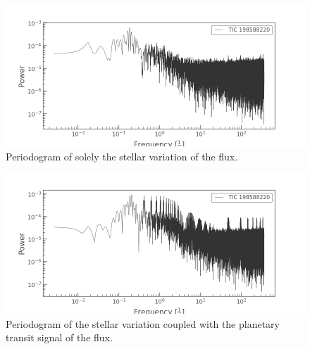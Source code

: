 \documentclass[twocolumn]{aastex631}
\begin{document}

\begin{figure}
    \includegraphics[width=\linewidth]{figures/stellar_periodogram.png}
    \caption{Periodogram of solely the stellar variation of the flux. }
    \label{fig:stellar_periodogram}
\end{figure}

\begin{figure}
    \includegraphics[width=\linewidth]{figures/planetary_periodogram.png}
    \caption{Periodogram of the stellar variation coupled with the planetary transit signal of the flux. }
    \label{fig:planetary_periodogram}
\end{figure}
\end{document}
